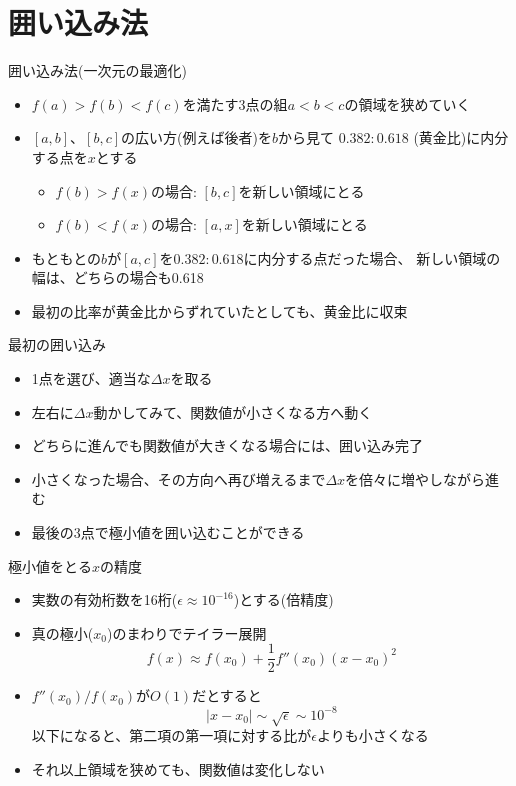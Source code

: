\section{囲い込み法}

\begin{frame}[t,fragile]{囲い込み法(一次元の最適化)}
  \begin{itemize}
    \setlength{\itemsep}{1em}
  \item $f(a) > f(b) < f(c)$を満たす3点の組$a < b < c$の領域を狭めていく
  \item $[a,b]$、$[b,c]$の広い方(例えば後者)を$b$から見て
    $0.382:0.618$ (黄金比)に内分する点を$x$とする
    \begin{itemize}
    \item $f(b) > f(x)$の場合: $[b,c]$を新しい領域にとる
    \item $f(b) < f(x)$の場合: $[a,x]$を新しい領域にとる
    \end{itemize}
  \item もともとの$b$が$[a,c]$を$0.382:0.618$に内分する点だった場合、
    新しい領域の幅は、どちらの場合も0.618
  \item 最初の比率が黄金比からずれていたとしても、黄金比に収束
  \end{itemize}
\end{frame}

\begin{frame}[t,fragile]{最初の囲い込み}
  \begin{itemize}
    \setlength{\itemsep}{1em}
  \item 1点を選び、適当な$\Delta x$を取る
  \item 左右に$\Delta x$動かしてみて、関数値が小さくなる方へ動く
  \item どちらに進んでも関数値が大きくなる場合には、囲い込み完了
  \item 小さくなった場合、その方向へ再び増えるまで$\Delta x$を倍々に増やしながら進む
  \item 最後の3点で極小値を囲い込むことができる
  \end{itemize}
\end{frame}

\begin{frame}[t,fragile]{極小値をとる$x$の精度}
  \begin{itemize}
    \setlength{\itemsep}{1em}
  \item 実数の有効桁数を16桁($\epsilon \approx 10^{-16}$)とする(倍精度)
  \item 真の極小($x_0$)のまわりでテイラー展開
    \[
    f(x) \approx f(x_0) + \frac{1}{2} f''(x_0) (x-x_0)^2
    \]
  \item $f''(x_0) / f(x_0)$が$O(1)$だとすると
    \[
    |x-x_0| \sim \sqrt{\epsilon} \sim 10^{-8}
    \]
    以下になると、第二項の第一項に対する比が$\epsilon$よりも小さくなる
  \item それ以上領域を狭めても、関数値は変化しない
  \end{itemize}
\end{frame}

